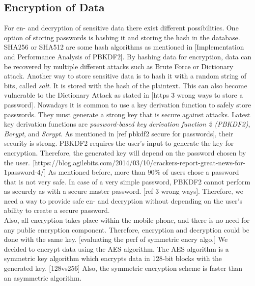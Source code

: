 
\subsection{Encryption of Data}\label{arch_encryption}
For en- and decryption of sensitive data there exist different possibilities. One option of storing passwords is hashing it and storing the hash in the database. SHA256 or SHA512 are some hash algorithms as mentioned in [Implementation and Performance Analysis of PBKDF2]. By hashing data for encryption, data can be recovered by multiple different attacks such as Brute Force or Dictionary attack.
Another way to store sensitive data is to hash it with a random string of bits, called \textit{salt}. It is stored with the hash of the plaintext. This can also become vulnerable to the Dictionary Attack as stated in [https 3 wrong ways to store a password].
Nowadays it is common to use a key derivation function to safely store passwords. They must generate a strong key that is secure against attacks. Latest key derivation functions are \textit{password-based key derivation function 2 (PBKDF2)}, \textit{Bcrypt}, and \textit{Scrypt}. As mentioned in [ref pbkdf2 secure for passwords], their security is strong.
PBKDF2 requires the user's input to generate the key for encryption. Therefore, the generated key will depend on the password chosen by the user. [https://blog.agilebits.com/2014/03/10/crackers-report-great-news-for-1password-4/] As mentioned before, more than 90\% of users chose a password that is not very safe. In case of a very simple password, PBKDF2 cannot perform as securely as with a secure master password. [ref 3 wrong ways]. Therefore, we need a way to provide safe en- and decryption without depending on the user's ability to create a secure password. \\

Also, all encryption takes place within the mobile phone, and there is no need for any public encryption component. Therefore, encryption and decryption could be done with the same key. [evaluating the perf of symmetric encry algo.] We decided to encrypt data using the AES algorithm. The AES algorithm is a symmetric key algorithm which encrypts data in 128-bit blocks with the generated key. [128vs256] Also, the symmetric encryption scheme is faster than an asymmetric algorithm.\\

